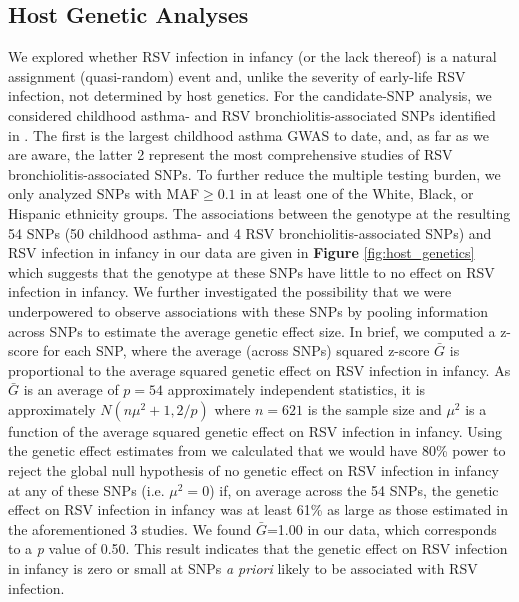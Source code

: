 \documentclass{article} %
\begin{document}
\clearpage										

\subsection{Host Genetic Analyses}
We explored whether RSV infection in infancy (or the lack thereof) is a natural assignment (quasi-random) event and, unlike the severity of early-life RSV infection,
\citep{larkin2015genes}
not determined by host genetics. 
For the candidate-SNP analysis, we considered childhood asthma- and RSV bronchiolitis-associated SNPs identified in 
\citet{pividori2019shared, janssen2007genetic, pasanen2017genome}.
The first is the largest childhood asthma GWAS to date, and, as far as we are aware, the latter 2 represent the most comprehensive studies of RSV bronchiolitis-associated SNPs. 
To further reduce the multiple testing burden, we only analyzed SNPs with MAF$\ge 0.1$ in at least one of the White, Black, or Hispanic ethnicity groups. 
The associations between the genotype at the resulting 54 SNPs (50 childhood asthma- and 4 RSV bronchiolitis-associated SNPs) and RSV infection in infancy in our data are given in 
\textbf{Figure} \ref{fig:host_genetics}
which suggests that the genotype at these SNPs have little to no effect on RSV infection in infancy. 
We further investigated the possibility that we were underpowered to observe associations with these SNPs by pooling information across SNPs to estimate the average genetic effect size. 
In brief, we computed a z-score for each SNP, where the average (across SNPs) squared z-score $\bar{G}$ is proportional to the average squared genetic effect on RSV infection in infancy. 
As $\bar{G}$ is an average of $p=54$ approximately independent statistics, 
it is approximately
$N(n\mu^2 + 1,2/p)$
where $n=621$ is the sample size and $\mu^2$ is a function of the average squared genetic effect on RSV infection in infancy. 
Using the genetic effect estimates from 
\citet{pividori2019shared, janssen2007genetic, pasanen2017genome}
we calculated that we would have 80\% power to reject the global null hypothesis of no genetic effect on RSV infection in infancy at any of these SNPs (i.e. $\mu^2 =0$) if, on average across the 54 SNPs, the genetic effect on RSV infection in infancy was at least 61\% as large as those estimated in the aforementioned 3 studies. 
We found $\bar{G}$=1.00 in our data, which corresponds to a \textit{p} value of 0.50. 
This result indicates that the genetic effect on RSV infection in infancy is zero or small at SNPs \textit{a priori} likely to be associated with RSV infection.	
\end{document}

